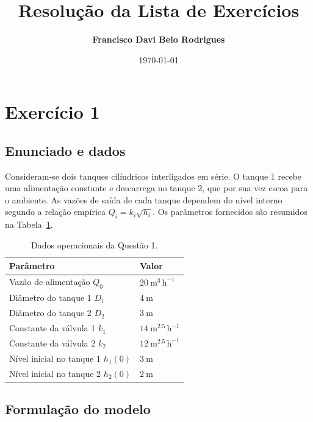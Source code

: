 \documentclass{article}
\title{Resolução da Lista de Exercícios}
\author{\textbf{Francisco Davi Belo Rodrigues}}
\date{\today}
\begin{document}
\fancyhead{}

\maketitle
\thispagestyle{fancy}

\section{Exercício 1}

\subsection*{Enunciado e dados}
Consideram-se dois tanques cilíndricos interligados em série. O tanque 1 recebe uma alimentação constante e descarrega no tanque 2, que por sua vez escoa para o ambiente. As vazões de saída de cada tanque dependem do nível interno segundo a relação empírica $Q_i = k_i\sqrt{h_i}$. Os parâmetros fornecidos são resumidos na Tabela~\ref{tab:dados-q1}.

\begin{table}[h!]
  \centering
  \begin{tabular}{ll}
    \hline
    \textbf{Parâmetro} & \textbf{Valor} \\
    \hline
    Vazão de alimentação $Q_0$ & $20\ \mathrm{m^3\,h^{-1}}$ \\
    Diâmetro do tanque 1 $D_1$ & $4\ \mathrm{m}$ \\
    Diâmetro do tanque 2 $D_2$ & $3\ \mathrm{m}$ \\
    Constante da válvula 1 $k_1$ & $14\ \mathrm{m^{2.5}\,h^{-1}}$ \\
    Constante da válvula 2 $k_2$ & $12\ \mathrm{m^{2.5}\,h^{-1}}$ \\
    Nível inicial no tanque 1 $h_1(0)$ & $3\ \mathrm{m}$ \\
    Nível inicial no tanque 2 $h_2(0)$ & $2\ \mathrm{m}$ \\
    \hline
  \end{tabular}
  \caption{Dados operacionais da Questão 1.}
  \label{tab:dados-q1}
\end{table}

\subsection*{Formulação do modelo}
\end{document}
